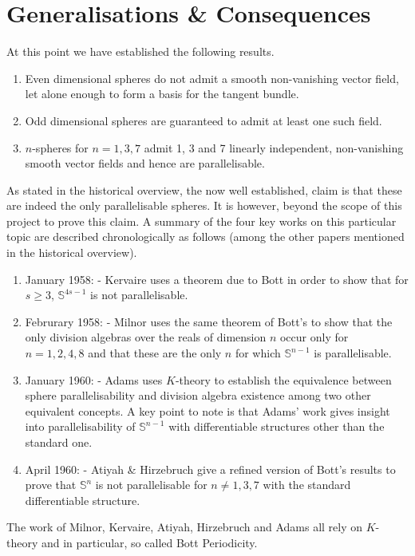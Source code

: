 \documentclass[12pt,a4paper]{article}
\begin{document}
\section{Generalisations \& Consequences}
At this point we have established the following results.
\begin{enumerate}
\item Even dimensional spheres do not admit a smooth non-vanishing vector field, let alone enough to form a basis for the tangent bundle.
\item Odd dimensional spheres are guaranteed to admit at least one such field.
\item $n$-spheres for $n=1,3,7$ admit 1, 3 and 7 linearly independent, non-vanishing smooth vector fields and hence are parallelisable.
\end{enumerate}
As stated in the historical overview, the now well established, claim is that these are indeed the only parallelisable spheres. It is however, beyond the scope of this project to prove this claim. A summary of the four key works on this particular topic are described chronologically as follows (among the other papers mentioned in the historical overview).
\begin{enumerate}
\item January 1958: \cite{MR3075371} - Kervaire uses a theorem due to Bott in order to show that for $s\geq 3$, $\mathbb{S}^{4s-1}$ is not parallelisable. 
\item Februrary 1958: \cite{MR0102805} - Milnor uses the same theorem of Bott's to show that the only division algebras over the reals of dimension $n$ occur only for $n=1,2,4,8$ and that these are the only $n$ for which $\mathbb{S}^{n-1}$ is parallelisable. 
\item January 1960: \cite{MR0141119} - Adams uses $K$-theory to establish the equivalence between sphere parallelisability and division algebra existence among two other equivalent concepts. A key point to note is that Adams' work gives insight into parallelisability of $\mathbb{S}^{n-1}$ with differentiable structures other than the standard one.
\item April 1960: \cite{atiyah1961bott} - Atiyah \& Hirzebruch give a refined version of Bott's results to prove that $\mathbb{S}^n$ is not parallelisable for $n\neq 1,3,7$ with the standard differentiable structure. 
\end{enumerate}
The work of Milnor, Kervaire, Atiyah, Hirzebruch and Adams all rely on $K$-theory and in particular, so called Bott Periodicity.
%
\end{document}
